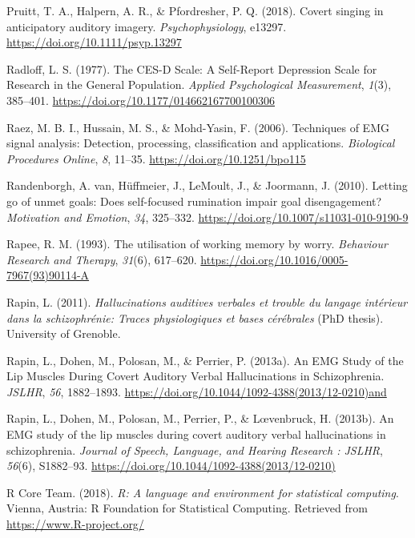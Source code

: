 \documentclass[a4paper,12pt,twoside,openright,oldfontcommands]{memoir}
\begin{document}
\leavevmode\hypertarget{ref-pruitt_covert_2018}{}%
Pruitt, T. A., Halpern, A. R., \& Pfordresher, P. Q. (2018). Covert singing in anticipatory auditory imagery. \emph{Psychophysiology}, e13297. \url{https://doi.org/10.1111/psyp.13297}

\leavevmode\hypertarget{ref-radloff_ces-d_1977}{}%
Radloff, L. S. (1977). The CES-D Scale: A Self-Report Depression Scale for Research in the General Population. \emph{Applied Psychological Measurement}, \emph{1}(3), 385--401. \url{https://doi.org/10.1177/014662167700100306}

\leavevmode\hypertarget{ref-raez_techniques_2006}{}%
Raez, M. B. I., Hussain, M. S., \& Mohd-Yasin, F. (2006). Techniques of EMG signal analysis: Detection, processing, classification and applications. \emph{Biological Procedures Online}, \emph{8}, 11--35. \url{https://doi.org/10.1251/bpo115}

\leavevmode\hypertarget{ref-VanRandenborgh2010}{}%
Randenborgh, A. van, Hüffmeier, J., LeMoult, J., \& Joormann, J. (2010). Letting go of unmet goals: Does self-focused rumination impair goal disengagement? \emph{Motivation and Emotion}, \emph{34}, 325--332. \url{https://doi.org/10.1007/s11031-010-9190-9}

\leavevmode\hypertarget{ref-rapee_utilisation_1993}{}%
Rapee, R. M. (1993). The utilisation of working memory by worry. \emph{Behaviour Research and Therapy}, \emph{31}(6), 617--620. \url{https://doi.org/10.1016/0005-7967(93)90114-A}

\leavevmode\hypertarget{ref-Rapin2011}{}%
Rapin, L. (2011). \emph{Hallucinations auditives verbales et trouble du langage intérieur dans la schizophrénie: Traces physiologiques et bases cérébrales} (PhD thesis). University of Grenoble.

\leavevmode\hypertarget{ref-rapin_emg_2013}{}%
Rapin, L., Dohen, M., Polosan, M., \& Perrier, P. (2013a). An EMG Study of the Lip Muscles During Covert Auditory Verbal Hallucinations in Schizophrenia. \emph{JSLHR}, \emph{56}, 1882--1893. \url{https://doi.org/10.1044/1092-4388(2013/12-0210)and}

\leavevmode\hypertarget{ref-Rapin2013}{}%
Rapin, L., Dohen, M., Polosan, M., Perrier, P., \& Lœvenbruck, H. (2013b). An EMG study of the lip muscles during covert auditory verbal hallucinations in schizophrenia. \emph{Journal of Speech, Language, and Hearing Research : JSLHR}, \emph{56}(6), S1882--93. \url{https://doi.org/10.1044/1092-4388(2013/12-0210)}

\leavevmode\hypertarget{ref-R-base}{}%
R Core Team. (2018). \emph{R: A language and environment for statistical computing}. Vienna, Austria: R Foundation for Statistical Computing. Retrieved from \url{https://www.R-project.org/}
\end{document}
